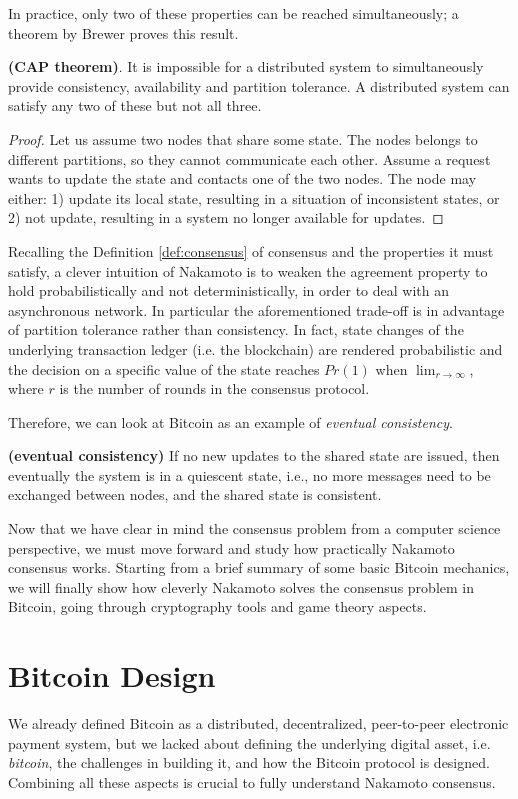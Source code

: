 \bigskip
\noindent
In practice, only two of these properties can be reached simultaneously; a theorem by Brewer proves this result.
\begin{thm} {\bf (CAP theorem)}.
    It is impossible for a distributed system to simultaneously provide consistency, availability and partition tolerance. A distributed system can satisfy any two of these but not all three.
\end{thm}
\begin{proof}
    Let us assume two nodes that share some state. The nodes belongs to different partitions, so they cannot communicate each other. Assume a request wants to update the state and contacts one of the two nodes. The node may either: 1) update its local state, resulting in a situation of inconsistent states, or 2) not update, resulting in a system no longer available for updates.
\end{proof}

\bigskip
\noindent
Recalling the Definition \ref{def:consensus} of consensus and the properties it must satisfy, a clever intuition of Nakamoto is to weaken the agreement property to hold probabilistically and not deterministically, in order to deal with an asynchronous network. In particular the aforementioned trade-off is in advantage of partition tolerance rather than consistency. In fact, state changes of the underlying transaction ledger (i.e. the blockchain) are rendered probabilistic and the decision on a specific value of the state reaches $Pr(1)$ when $\lim_{r \to \infty}$, where $r$ is the number of rounds in the consensus protocol.

\bigskip
\noindent
Therefore, we can look at Bitcoin as an example of \textit{eventual consistency}.
\begin{mydef}{\bf (eventual consistency)}
    If no new updates to the shared state are issued, then eventually the system is in a quiescent state, i.e., no more messages need to be exchanged between nodes, and the shared state is consistent.
\end{mydef}

\bigskip
\noindent
Now that we have clear in mind the consensus problem from a computer science perspective, we must move forward and study how practically Nakamoto consensus works. Starting from a brief summary of some basic Bitcoin mechanics, we will finally show how cleverly Nakamoto solves the consensus problem in Bitcoin, going through cryptography tools and game theory aspects.

\bigskip
\section{Bitcoin Design}
\label{sec:btc-design}
We already defined Bitcoin as a distributed, decentralized, peer-to-peer electronic payment system, but we lacked about defining the underlying digital asset, i.e. \textit{bitcoin}, the challenges in building it, and how the Bitcoin protocol is designed. Combining all these aspects is crucial to fully understand Nakamoto consensus.

